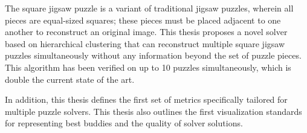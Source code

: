 The square jigsaw puzzle is a variant of traditional jigsaw puzzles, wherein all pieces are equal-sized squares; these pieces must be placed adjacent to one another to reconstruct an original image.  This thesis proposes a novel solver based on hierarchical clustering that can reconstruct multiple square jigsaw puzzles simultaneously without any information beyond the set of puzzle pieces.  This algorithm has been verified on up to 10 puzzles simultaneously, which is double the current state of the art.

In addition, this thesis defines the first set of metrics specifically tailored for multiple puzzle solvers.  This thesis also outlines the first visualization standards for representing best buddies and the quality of solver solutions.

